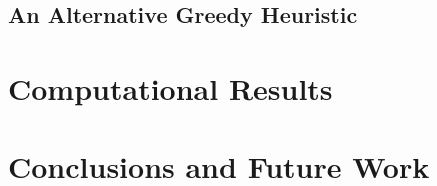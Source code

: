 \documentclass[runningheads,a4paper]{llncs}
\begin{document}
        \subsection{An Alternative Greedy Heuristic}
     \section{Computational Results}
     
     \section{Conclusions and Future Work}
     
     
  
    
    
\end{document}

